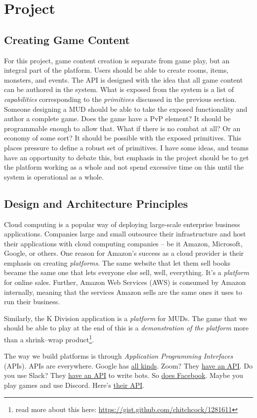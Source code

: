 \documentclass{article}
\newcommand{\enterProblemHeader}[1]{
}
\newcommand{\exitProblemHeader}[1]{
\nobreak\extramarks{#1}{}\nobreak
}
\newcounter{homeworkProblemCounter} %
\newcommand{\homeworkProblemName}{}
\newenvironment{homeworkProblem}[1][Problem \arabic{homeworkProblemCounter}]{ %
\stepcounter{homeworkProblemCounter} %
\renewcommand{\homeworkProblemName}{#1} %
\section{\homeworkProblemName} %
\enterProblemHeader{\homeworkProblemName} %
}{
\exitProblemHeader{\homeworkProblemName} %
}
\newcommand{\homeworkSectionName}{}
\newenvironment{homeworkSection}[1]{ %
\renewcommand{\homeworkSectionName}{#1} %
\subsection{\homeworkSectionName} %
\enterProblemHeader{\homeworkProblemName\ [\homeworkSectionName]} %
}{
\enterProblemHeader{\homeworkProblemName} %
}
\begin{document}
\begin{homeworkProblem}[Project]
\begin{homeworkSection}{Creating Game Content}
	For this project, game content creation is separate from game play, but an integral part of the platform. Users should be able to create rooms, items, monsters, and events. The API is designed with the idea that all game content can be authored in the system. What is exposed from the system is a list of \textit{capabilities} corresponding to the \textit{primitives} discussed in the previous section. Someone designing a MUD should be able to take the exposed functionality and author a complete game. Does the game have a PvP element? It should be programmable enough to allow that. What if there is no combat at all? Or an economy of some sort? It should be possible with the exposed primitives. This places pressure to define a robust set of primitives. I have some ideas, and teams have an opportunity to debate this, but emphasis in the project should be to get the platform working as a whole and not spend excessive time on this until the system is operational as a whole.
\end{homeworkSection}

\begin{homeworkSection}{Design and Architecture Principles}
	\label{sec:design-and-arch}
  Cloud computing is a popular way of deploying large-scale enterprise business applications. Companies large and small outsource their infrastructure and host their applications with cloud computing companies -- be it Amazon, Microsoft, Google, or others. One reason for Amazon's success as a cloud provider is their emphasis on creating \textit{platforms}. The same website that let them sell books became the same one that lets everyone else sell, well, everything. It's a \textit{platform} for online sales. Further, Amazon Web Services (AWS) is consumed by Amazon internally, meaning that the services Amazon sells are the same ones it uses to run their business.
  
  Similarly, the K Division application is a \textit{platform} for MUDs. The game that we should be able to play at the end of this is a \textit{demonstration of the platform} more than a shrink--wrap product\footnote{read more about this here: \url{https://gist.github.com/chitchcock/1281611}}.
  
  The way we build platforms is through \textit{Application Programming Interfaces} (APIs). APIs are everywhere. Google has \href{https://developers.google.com/apis-explorer}{all kinds}. Zoom? They \href{https://marketplace.zoom.us/docs/api-reference/zoom-api}{have an API}. Do you use Slack? They \href{https://api.slack.com/}{have an API} to write bots. So \href{https://developers.facebook.com/}{does Facebook}. Maybe you play games and use Discord. Here's \href{https://discord.com/developers/docs/intro}{their API}.
  

\end{homeworkSection}
\end{homeworkProblem}
\end{document}
